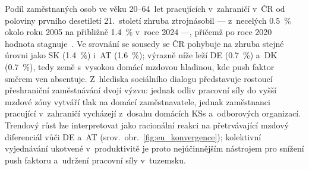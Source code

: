 Podíl zaměstnaných osob ve věku 20--64~let pracujících v~zahraničí v~ČR od poloviny prvního desetiletí 21.~století zhruba ztrojnásobil --- z~necelých \SI{0,5}{\percent} okolo roku 2005 na přibližně \SI{1,4}{\percent} v~roce 2024 ---, přičemž po roce 2020 hodnota stagnuje~\cite{eurostat_lfst_r_lfe2ecomm}.
Ve srovnání se sousedy se ČR pohybuje na zhruba stejné úrovni jako SK (\SI{1,4}{\percent}) i~AT (\SI{1,6}{\percent}); výrazně níže leží DE (\SI{0,7}{\percent}) a~DK (\SI{0,7}{\percent}), tedy země s~vysokou domácí mzdovou hladinou, kde push faktor směrem ven absentuje.
Z~hlediska sociálního dialogu představuje rostoucí přeshraniční zaměstnávání dvojí výzvu: jednak odliv pracovní síly do vyšší mzdové zóny vytváří tlak na domácí zaměstnavatele, jednak zaměstnanci pracující v~zahraničí vycházejí z~dosahu domácích \acp{KS} a~odborových organizací.
Trendový růst lze interpretovat jako racionální reakci na přetrvávající mzdový diferenciál vůči DE a~AT (srov.~obr.~\ref{fig:eu_konvergence}); kolektivní vyjednávání ukotvené v~produktivitě je proto nejúčinnějším nástrojem pro snížení push faktoru a~udržení pracovní síly v~tuzemsku.


